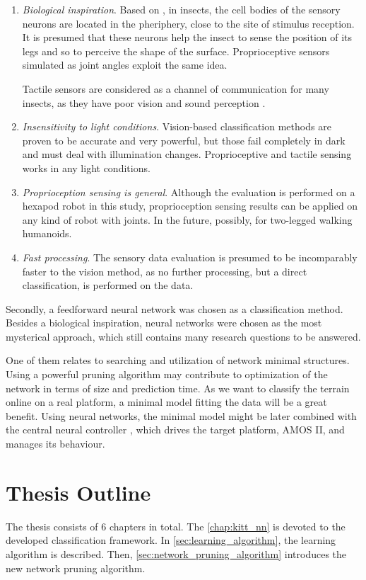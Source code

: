 \begin{enumerate}
\item \textit{Biological inspiration}. Based on \citep{article:insect}, in insects, the cell bodies of the sensory neurons are located in the pheriphery, close to the site of stimulus reception. It is presumed that these neurons help the insect to sense the position of its legs and so to perceive the shape of the surface. Proprioceptive sensors simulated as joint angles exploit the same idea.

Tactile sensors are considered as a channel of communication for many insects, as they have poor vision and sound perception \citep{misc:insect_tactile}. 

\item \textit{Insensitivity to light conditions}. Vision-based classification methods are proven to be accurate and very powerful, but those fail completely in dark and must deal with illumination changes. Proprioceptive and tactile sensing works in any light conditions.

\item \textit{Proprioception sensing is general}. Although the evaluation is performed on a hexapod robot in this study, proprioception sensing results can be applied on any kind of robot with joints. In the future, possibly, for two-legged walking humanoids.

\item \textit{Fast processing}. The sensory data evaluation is presumed to be incomparably faster to the vision method, as no further processing, but a direct classification, is performed on the data.
\end{enumerate}

Secondly, a feedforward neural network was chosen as a classification method. Besides a biological inspiration, neural networks were chosen as the most mysterical approach, which still contains many research questions to be answered. 

One of them relates to searching and utilization of network minimal structures. Using a powerful pruning algorithm may contribute to optimization of the network in terms of size and prediction time. As we want to classify the terrain online on a real platform, a minimal model fitting the data will be a great benefit. Using neural networks, the minimal model might be later combined with the central neural controller \citep{misc:amosii}, which drives the target platform, AMOS II, and manages its behaviour.

\section{Thesis Outline}
The thesis consists of 6 chapters in total. The \cref{chap:kitt_nn} is devoted to the developed classification framework. In \cref{sec:learning_algorithm}, the learning algorithm is described. Then, \cref{sec:network_pruning_algorithm} introduces the new network pruning algorithm.

